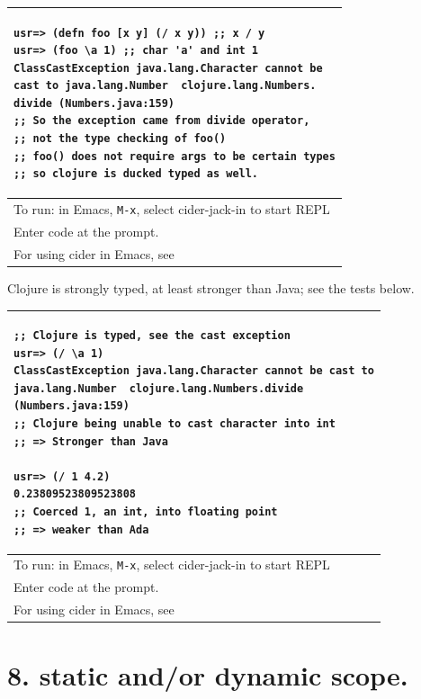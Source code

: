 \documentclass[12pt]{article}
\begin{document}
\begin{tabular}{|p{}|}
\hline
\begin{verbatim}
usr=> (defn foo [x y] (/ x y)) ;; x / y
usr=> (foo \a 1) ;; char 'a' and int 1
ClassCastException java.lang.Character cannot be 
cast to java.lang.Number  clojure.lang.Numbers.
divide (Numbers.java:159)
;; So the exception came from divide operator,
;; not the type checking of foo()
;; foo() does not require args to be certain types
;; so clojure is ducked typed as well.
\end{verbatim}
\\
\hline
To run: in Emacs, \texttt{M-x}, select cider-jack-in to start REPL\\
Enter code at the prompt.\\
For using cider in Emacs, see \cite{brave2015}\\
\hline
\end{tabular}



\newpage


Clojure is strongly typed, at least stronger than Java; see the tests below.

\begin{tabular}{|p{}|}
\hline
\begin{verbatim}
;; Clojure is typed, see the cast exception
usr=> (/ \a 1)
ClassCastException java.lang.Character cannot be cast to
java.lang.Number  clojure.lang.Numbers.divide 
(Numbers.java:159)
;; Clojure being unable to cast character into int
;; => Stronger than Java

usr=> (/ 1 4.2)
0.23809523809523808
;; Coerced 1, an int, into floating point
;; => weaker than Ada
\end{verbatim}
\\
\hline
To run: in Emacs, \texttt{M-x}, select cider-jack-in to start REPL\\
Enter code at the prompt.\\
For using cider in Emacs, see \cite{brave2015}\\
\hline
\end{tabular}





\part{8. static and/or dynamic scope.}
\end{document}

